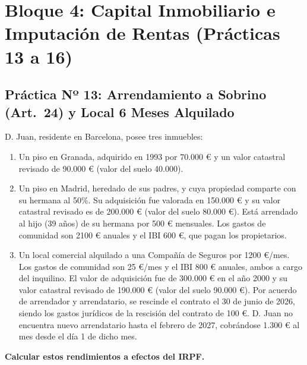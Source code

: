 \documentclass[11pt,a4paper,openany]{article}
\begin{document}
\section{Bloque 4: Capital Inmobiliario e Imputación de Rentas (Prácticas 13 a 16)}

\subsection{Práctica Nº 13: Arrendamiento a Sobrino (Art.~24) y Local 6 Meses Alquilado}

\begin{enunciadoBox}
D. Juan, residente en Barcelona, posee tres inmuebles:
\begin{enumerate}[label=\textbf{\alph*.}]
    \item Un piso en Granada, adquirido en 1993 por 70.000 \euro{} y un valor catastral revisado de 90.000 \euro{} (valor del suelo 40.000).
    \item Un piso en Madrid, heredado de sus padres, y cuya propiedad comparte con su hermana al 50\%. Su adquisición fue valorada en 150.000 \euro{} y su valor catastral revisado es de 200.000 \euro{} (valor del suelo 80.000 \euro{}). Está arrendado al hijo (39 años) de su hermana por 500 \euro{} mensuales. Los gastos de comunidad son 2100 \euro{} anuales y el IBI 600 \euro{}, que pagan los propietarios.
    \item Un local comercial alquilado a una Compañía de Seguros por 1200 \euro{}/mes. Los gastos de comunidad son 25 \euro{}/mes y el IBI 800 \euro{} anuales, ambos a cargo del inquilino. El valor de adquisición fue de 300.000 \euro{} en el año 2000 y su valor catastral revisado de 190.000 \euro{} (valor del suelo 90.000 \euro{}). Por acuerdo de arrendador y arrendatario, se rescinde el contrato el 30 de junio de 2026, siendo los gastos jurídicos de la rescisión del contrato de 100 \euro{}. D. Juan no encuentra nuevo arrendatario hasta el febrero de 2027, cobrándose 1.300 \euro{} al mes desde el día 1 de dicho mes.
\end{enumerate}
\textbf{Calcular estos rendimientos a efectos del IRPF.}
\end{enunciadoBox}
\end{document}
